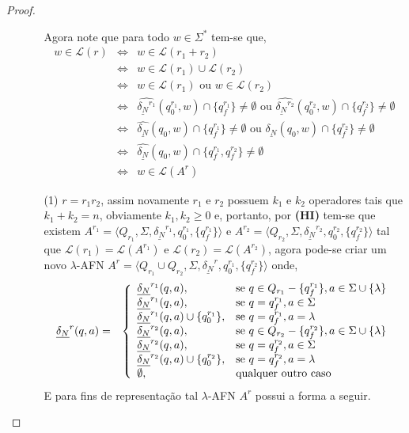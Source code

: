 \begin{proof}
\begin{itemize}
\begin{itemize}
			Agora note que para todo $w \in \Sigma^*$ tem-se que,
			\begin{eqnarray*}
				w \in \mathcal{L}(r) & \Longleftrightarrow & w \in \mathcal{L}(r_1 + r_2)\\
				& \Longleftrightarrow & w \in \mathcal{L}(r_1) \cup  \mathcal{L}(r_2)\\
				& \Longleftrightarrow & w \in \mathcal{L}(r_1) \text{ ou } w \in \mathcal{L}(r_2)\\
				& \Longleftrightarrow & \widehat{\underline{\delta_N}^{r_1}}(q_0^{r_1}, w) \cap \{q_f^{r_1}\} \neq \emptyset \text{ ou } \widehat{\underline{\delta_N}^{r_2}}(q_0^{r_2}, w) \cap \{q_f^{r_2}\} \neq \emptyset\\
				& \Longleftrightarrow & \widehat{\underline{\delta_N}}(q_0, w) \cap \{q_f^{r_1}\} \neq \emptyset \text{ ou } \widehat{\underline{\delta_N}}(q_0, w) \cap \{q_f^{r_2}\} \neq \emptyset\\
				& \Longleftrightarrow & \widehat{\underline{\delta_N}}(q_0, w) \cap \{q_f^{r_1}, q_f^{r_2}\} \neq \emptyset\\
				& \Longleftrightarrow & w \in \mathcal{L}(A^r)
			\end{eqnarray*}
			
			\item[(1)] $r = r_1r_2$, assim novamente $r_1$ e $r_2$ possuem $k_1$ e $k_2$ operadores tais que $k_1 + k_2 = n$, obviamente $k_1, k_2 \geq 0$ e, portanto, por \textbf{(HI)} tem-se que existem $A^{r_1} = \langle Q_{r_1}, \Sigma, \underline{\delta_N}^{r_1}, q_0^{r_1}, \{q_f^{r_1}\}\rangle$ e $A^{r_2} = \langle Q_{r_2}, \Sigma, \underline{\delta_N}^{r_2}, q_0^{r_2}, \{q_f^{r_2}\}\rangle$  tal que $\mathcal{L}(r_1) = \mathcal{L}(A^{r_1})$ e $\mathcal{L}(r_2) = \mathcal{L}(A^{r_2})$, agora pode-se criar um novo $\lambda$-AFN $A^r = \langle Q_{r_1} \cup Q_{r_2}, \Sigma, \underline{\delta_N}^r, q_0^{r_1}, \{q_f^{r_2}\}\rangle$ onde,
			\begin{eqnarray*}
				\underline{\delta_N}^r(q, a) & = & 
				\left\{\begin{array}{ll}	
					\underline{\delta_N}^{r_1}(q, a), & \hbox{se } q \in Q_{r_1} - \{q^{r_1}_f\}, a \in \Sigma \cup \{\lambda\}\\
					\underline{\delta_N}^{r_1}(q, a), & \hbox{se } q = q^{r_1}_f, a \in \Sigma\\
					\underline{\delta_N}^{r_1}(q, a) \cup \{q^{r_1}_0\}, & \hbox{se } q = q^{r_1}_f, a = \lambda\\
					\underline{\delta_N}^{r_2}(q, a), & \hbox{se } q \in Q_{r_2} - \{q^{r_2}_f\}, a \in \Sigma \cup \{\lambda\}\\
					\underline{\delta_N}^{r_2}(q, a), & \hbox{se } q = q^{r_2}_f, a \in \Sigma\\
					\underline{\delta_N}^{r_2}(q, a) \cup \{q^{r_2}_0\}, & \hbox{se } q = q^{r_2}_f, a = \lambda\\
					\emptyset, & \hbox{qualquer outro caso}
				\end{array}\right.
			\end{eqnarray*}
			E para fins de representação tal $\lambda$-AFN $A^r$ possui a forma a seguir.
			

\end{itemize}
\end{itemize}
\end{proof}
